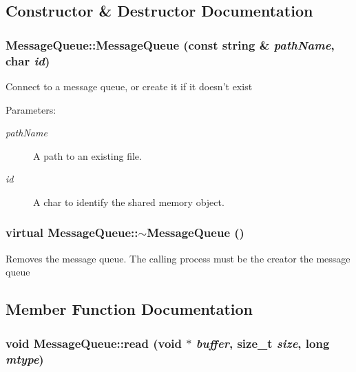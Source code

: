 \subsection{Constructor \& Destructor Documentation}
\hypertarget{classMessageQueue_9f9fba196c790b1c6ffc8942bfd2227a}{
\subsubsection[{MessageQueue}]{\setlength{\rightskip}{0pt plus 5cm}MessageQueue::MessageQueue (const string \& {\em pathName}, \/  char {\em id})}}
\label{classMessageQueue_9f9fba196c790b1c6ffc8942bfd2227a}


Connect to a message queue, or create it if it doesn't exist

\begin{Desc}
\item[Parameters:]
\begin{description}
\item[{\em pathName}]A path to an existing file. \item[{\em id}]A char to identify the shared memory object. \end{description}
\end{Desc}
\hypertarget{classMessageQueue_63b519d0981515633e3d1ae8358f4e94}{
\subsubsection[{$\sim$MessageQueue}]{\setlength{\rightskip}{0pt plus 5cm}virtual MessageQueue::$\sim$MessageQueue ()}}
\label{classMessageQueue_63b519d0981515633e3d1ae8358f4e94}


Removes the message queue. The calling process must be the creator the message queue 

\subsection{Member Function Documentation}
\hypertarget{classMessageQueue_1ce5443461c439d7d564f0d04d44d812}{
\subsubsection[{read}]{\setlength{\rightskip}{0pt plus 5cm}void MessageQueue::read (void $\ast$ {\em buffer}, \/  size\_\-t {\em size}, \/  long {\em mtype})}}
\label{classMessageQueue_1ce5443461c439d7d564f0d04d44d812}


